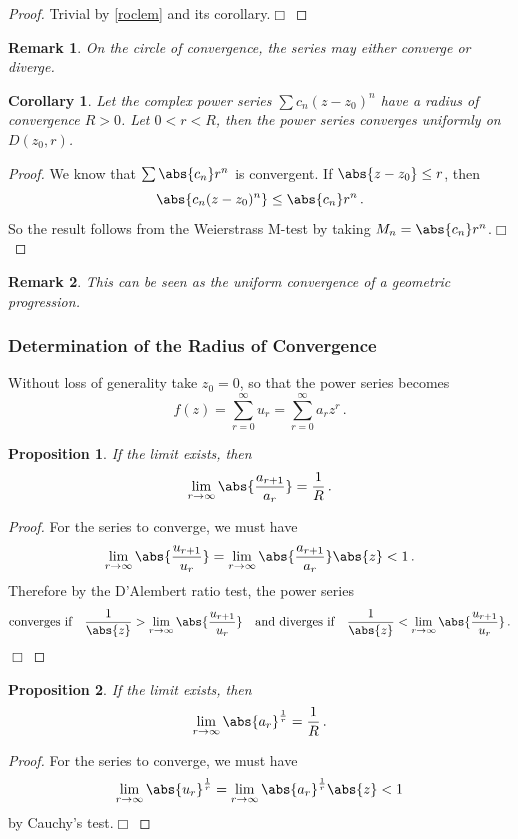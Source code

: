 \documentclass{article}
\theoremstyle{plain}\theoremheaderfont{\normalfont\itshape}\theorembodyfont{\rmfamily}\theoremseparator{.}\newtheorem*{rem}{Remark}\newtheorem*{ex}{Example}\newtheorem*{proof}{Proof}\newtheorem*{altp}{Alternative proof}
\theoremstyle{plain}\theoremheaderfont{\normalfont\bfseries}\theorembodyfont{\rmfamily}\theoremseparator{.}\newtheorem{thm}{Theorem}[section]\newtheorem{lem}[thm]{Lemma}\newtheorem{prop}[thm]{Proposition}\newtheorem*{cor}{Corollary}\newtheorem{defn}[thm]{Definition}\newtheorem{clm}[thm]{Claim}\newtheorem{clminproof}{Claim}
\theoremstyle{break}\theoremheaderfont{\normalfont\itshape}\theorembodyfont{\rmfamily}\theoremseparator{.\medskip}\newtheorem*{proofskip}{Proof}\newtheorem*{exs}{Examples}\newtheorem*{rems}{Remarks}
\theoremstyle{break}\theoremheaderfont{\normalfont\bfseries}\theorembodyfont{\rmfamily}\theoremseparator{.\medskip}\newtheorem{lemskip}[thm]{Lemma}\newtheorem{defnskip}[thm]{Definition}\newtheorem{propskip}[thm]{Proposition}\newtheorem{thmskip}[thm]{Theorem}
\numberwithin{equation}{section}
\newcommand{\qed}{\hfill\ensuremath{\Box}}
\begin{document}
	\begin{proof}
		Trivial by \cref{roclem} and its corollary.\qed
	\end{proof}
	\begin{rem}
		On the circle of convergence, the series may either converge or diverge.
	\end{rem}
	\begin{cor}
		Let the complex power series \(\sum c_n(z-z_0)^n\) have a radius of convergence \(R>0\). Let \(0<r<R\), then the power series converges uniformly on \(D(z_0,r)\).
	\end{cor}
	\begin{proof}
		We know that \(\sum\abs{c_n}r^n\) is convergent. If \(\abs{z-z_0}\le r\), then
		\[\abs{c_n(z-z_0)^n}\le\abs{c_n}r^n\,.\]
		So the result follows from the Weierstrass M-test by taking \(M_n=\abs{c_n}r^n\).\qed
	\end{proof}
	\begin{rem}
		This can be seen as the uniform convergence of a geometric progression.
	\end{rem}
	\subsubsection{Determination of the Radius of Convergence}
	Without loss of generality take \(z_0=0\), so that the power series becomes
	\[f(z)=\sum_{r=0}^{\infty}u_r=\sum_{r=0}^{\infty}a_rz^r\,.\]
	\begin{prop}
		If the limit exists, then
		\[\lim_{r\to\infty}\abs{\frac{a_{r+1}}{a_r}}=\frac{1}{R}\,.\]
	\end{prop}
	\begin{proof}
		For the series to converge, we must have
		\[\lim_{r\to\infty}\abs{\frac{u_{r+1}}{u_r}}=\lim_{r\to\infty}\abs{\frac{a_{r+1}}{a_r}}\abs{z}<1\,.\]
		Therefore by the D'Alembert ratio test, the power series
		\[\text{converges if}\quad\frac{1}{\abs{z}}>\lim_{r\to\infty}\abs{\frac{u_{r+1}}{u_r}}\quad\text{and diverges if}\quad\frac{1}{\abs{z}}<\lim_{r\to\infty}\abs{\frac{u_{r+1}}{u_r}}\,.\]\qed
	\end{proof}
	\begin{prop}
		If the limit exists, then
		\[\lim_{r\to\infty}\abs{a_r}^{\frac{1}{r}}=\frac{1}{R}\,.\]
	\end{prop}
	\begin{proof}
		For the series to converge, we must have
		\[\lim_{r\to\infty}\abs{u_r}^{\frac{1}{r}}=\lim_{r\to\infty}\abs{a_r}^{\frac{1}{r}}\abs{z}<1\]
		by Cauchy's test.\qed
	\end{proof}
\end{document}
